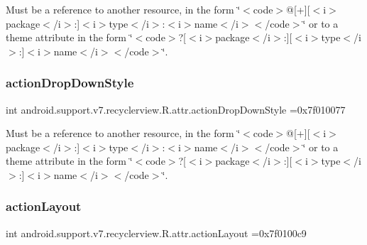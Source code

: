 Must be a reference to another resource, in the form \char`\"{}$<$code$>$@\mbox{[}+\mbox{]}\mbox{[}$<$i$>$package$<$/i$>$\+:\mbox{]}$<$i$>$type$<$/i$>$\+:$<$i$>$name$<$/i$>$$<$/code$>$\char`\"{} or to a theme attribute in the form \char`\"{}$<$code$>$?\mbox{[}$<$i$>$package$<$/i$>$\+:\mbox{]}\mbox{[}$<$i$>$type$<$/i$>$\+:\mbox{]}$<$i$>$name$<$/i$>$$<$/code$>$\char`\"{}. \mbox{\label{classandroid_1_1support_1_1v7_1_1recyclerview_1_1R_1_1attr_a4247daa006d67b3271a3f0f6ec62d53a}} 
\subsubsection{\texorpdfstring{action\+Drop\+Down\+Style}{actionDropDownStyle}}
{\footnotesize\ttfamily int android.\+support.\+v7.\+recyclerview.\+R.\+attr.\+action\+Drop\+Down\+Style =0x7f010077\hspace{0.3cm}{\ttfamily [static]}}

Must be a reference to another resource, in the form \char`\"{}$<$code$>$@\mbox{[}+\mbox{]}\mbox{[}$<$i$>$package$<$/i$>$\+:\mbox{]}$<$i$>$type$<$/i$>$\+:$<$i$>$name$<$/i$>$$<$/code$>$\char`\"{} or to a theme attribute in the form \char`\"{}$<$code$>$?\mbox{[}$<$i$>$package$<$/i$>$\+:\mbox{]}\mbox{[}$<$i$>$type$<$/i$>$\+:\mbox{]}$<$i$>$name$<$/i$>$$<$/code$>$\char`\"{}. \mbox{\label{classandroid_1_1support_1_1v7_1_1recyclerview_1_1R_1_1attr_af019af7cc366f5d3ef759cf2f80f8a70}} 
\subsubsection{\texorpdfstring{action\+Layout}{actionLayout}}
{\footnotesize\ttfamily int android.\+support.\+v7.\+recyclerview.\+R.\+attr.\+action\+Layout =0x7f0100c9\hspace{0.3cm}{\ttfamily [static]}}

